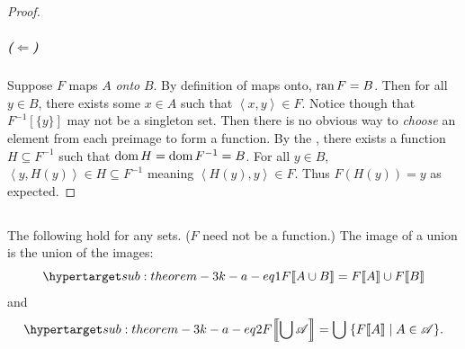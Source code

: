 \documentclass{report}
\newcommand{\pair}[1]{\left< #1 \right>}
\begin{document}
\begin{proof}
    \subparagraph{($\Leftarrow$)}%

      Suppose $F$ maps $A$ \textit{onto} $B$.
      By definition of maps onto, $\mathop{\text{ran}}{F} = B$.
      Then for all $y \in B$, there exists some $x \in A$ such that
        $\pair{x, y} \in F$.
      Notice though that $F^{-1}[\{y\}]$ may not be a singleton set.
      Then there is no obvious way to \textit{choose} an element from each
        preimage to form a function.
      By the , there exists a function
        $H \subseteq F^{-1}$ such that $\mathop{\text{dom}}{H} = \mathop{\text{dom}}{F^{-1}} = B$.
      For all $y \in B$, $\pair{y, H(y)} \in H \subseteq F^{-1}$
        meaning $\pair{H(y), y} \in F$.
      Thus $F(H(y)) = y$ as expected.

\end{proof}

\subsection{}%

\begin{theorem}[3K(a)]

  The following hold for any sets. ($F$ need not be a function.)
  The image of a union is the union of the images:
    \begin{equation}
      \hyperlabel{sub:theorem-3k-a-eq1}
      \img{F}{A \cup B} = \img{F}{A} \cup \img{F}{B}
    \end{equation}
    and
    \begin{equation}
      \hyperlabel{sub:theorem-3k-a-eq2}
      \img{F}{\bigcup{\mathscr{A}}} =
        \bigcup\;\{\img{F}{A} \mid A \in \mathscr{A}\}.
    \end{equation}

\end{theorem}
\end{document}
